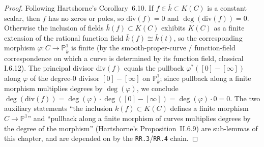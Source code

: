 \begin{proof}
  Following Hartshorne's Corollary~6.10. If \(f \in \bar k \subset K(C)\) is
  a constant scalar, then \(f\) has no zeros or poles, so \(\mathrm{div}(f) = 0\) and
  \(\deg(\mathrm{div}(f)) = 0\). Otherwise the inclusion of fields
  \(\bar k(f) \subset K(C)\) exhibits \(K(C)\) as a finite extension of the
  rational function field \(\bar k(f) \cong \bar k(t)\), so the corresponding
  morphism \(\varphi \colon C \to \mathbb P^1_{\bar k}\) is finite (by the
  smooth-proper-curve / function-field correspondence on which a curve is
  determined by its function field, classical I.6.12). The principal
  divisor \(\mathrm{div}(f)\) equals the pullback \(\varphi^{*}([0] - [\infty])\)
  along \(\varphi\) of the degree-\(0\) divisor \([0] - [\infty]\) on
  \(\mathbb P^1_{\bar k}\); since pullback along a finite morphism
  multiplies degrees by \(\deg(\varphi)\), we conclude
  $\deg(\mathrm{div}(f)) = \deg(\varphi) \cdot \deg([0] - [\infty]) = \deg(\varphi)
  \cdot 0 = 0$.
  The two auxiliary statements ``the inclusion \(\bar k(f) \subset K(C)\)
  defines a finite morphism \(C \to \mathbb P^1\)'' and ``pullback along
  a finite morphism of curves multiplies degrees by the degree of the
  morphism'' (Hartshorne's Proposition~II.6.9) are sub-lemmas of this
  chapter, and are depended on by the \texttt{RR.3}/\texttt{RR.4} chain.
\end{proof}
